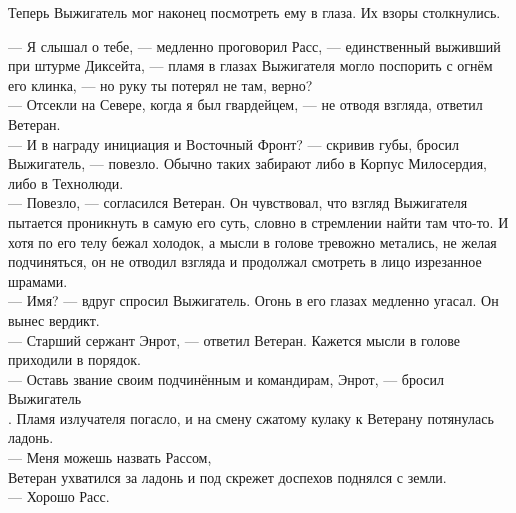 Теперь Выжигатель мог наконец посмотреть ему в глаза. Их взоры столкнулись.

\noindent --- Я слышал о тебе, --- медленно проговорил Расс, --- единственный 
выживший при штурме Диксейта, --- пламя в глазах Выжигателя могло поспорить с 
огнём его клинка, --- но руку ты потерял не там, верно?\\
--- Отсекли на Севере, когда я был гвардейцем, --- не отводя взгляда, ответил 
Ветеран.\\
--- И в награду инициация и Восточный Фронт? --- скривив губы, бросил 
Выжигатель, --- повезло. Обычно таких забирают либо в Корпус Милосердия, либо в 
Технолюди.\\
--- Повезло, --- согласился Ветеран. Он чувствовал, что взгляд Выжигателя 
пытается проникнуть в самую его суть, словно в стремлении найти там что-то. И 
хотя по его телу бежал холодок, а мысли в голове тревожно метались, не желая 
подчиняться, он не отводил взгляда и продолжал смотреть в лицо изрезанное 
шрамами.\\
--- Имя? --- вдруг спросил Выжигатель. Огонь в его глазах медленно угасал. Он 
вынес вердикт.\\
--- Старший сержант Энрот, --- ответил Ветеран. Кажется мысли в голове 
приходили в порядок.\\
--- Оставь звание своим подчинённым и командирам, Энрот, --- бросил 
Выжигатель\\.
Пламя излучателя погасло, и на смену сжатому кулаку к Ветерану потянулась 
ладонь.\\
--- Меня можешь назвать Рассом,\\
Ветеран ухватился за ладонь и под скрежет доспехов поднялся с земли.\\
--- Хорошо Расс.